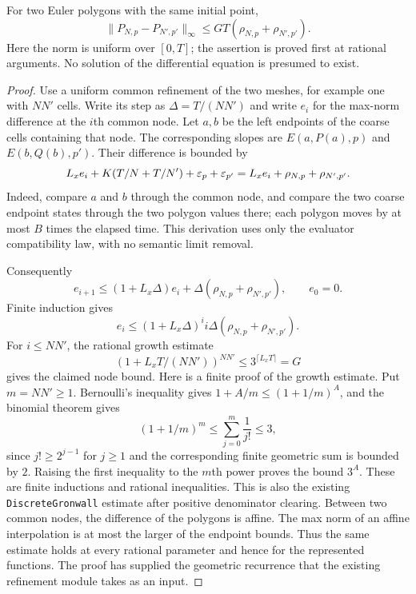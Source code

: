 \begin{lemma}
\label{lem:analytic-euler-comparison}
For two Euler polygons with the same initial point,
\begin{equation}
 \|P_{N,p}-P_{N',p'}\|_\infty
 \le GT(\rho_{N,p}+\rho_{N',p'}).\label{eq:analytic-euler-comparison}
\end{equation}
Here the norm is uniform over $[0,T]$; the assertion is proved first at rational arguments.  No solution of the differential equation is presumed to exist.
\end{lemma}

\begin{proof}
Use a uniform common refinement of the two meshes, for example one with $NN'$ cells.  Write its step as $\Delta=T/(NN')$ and write $e_i$ for the max-norm difference at the $i$th common node.  Let $a,b$ be the left endpoints of the coarse cells containing that node.  The corresponding slopes are $E(a,P(a),p)$ and $E(b,Q(b),p')$.  Their difference is bounded by
\[
 L_xe_i+K(T/N+T/N')+\varepsilon_p+\varepsilon_{p'}
 =L_xe_i+\rho_{N,p}+\rho_{N',p'}.
\]
Indeed, compare $a$ and $b$ through the common node, and compare the two coarse endpoint states through the two polygon values there; each polygon moves by at most $B$ times the elapsed time.  This derivation uses only the evaluator compatibility law, with no semantic limit removal.

Consequently
\[
 e_{i+1}\le(1+L_x\Delta)e_i+
 \Delta(\rho_{N,p}+\rho_{N',p'}),\qquad e_0=0.
\]
Finite induction gives
\[
 e_i\le(1+L_x\Delta)^i
 i\Delta(\rho_{N,p}+\rho_{N',p'}).
\]
For $i\le NN'$, the rational growth estimate
\[
 (1+L_xT/(NN'))^{NN'}\le3^{\lceil L_xT\rceil}=G
\]
gives the claimed node bound.  Here is a finite proof of the growth estimate.  Put $m=NN'\ge1$.  Bernoulli's inequality gives $1+A/m\le(1+1/m)^A$, and the binomial theorem gives\[
 (1+1/m)^m\le\sum_{j=0}^{m}\frac1{j!}\le3,
\]
since $j!\ge2^{j-1}$ for $j\ge1$ and the corresponding finite geometric sum is bounded by $2$.  Raising the first inequality to the $m$th power proves the bound $3^A$.  These are finite inductions and rational inequalities.  This is also the existing \texttt{DiscreteGronwall} estimate after positive denominator clearing.  Between two common nodes, the difference of the polygons is affine.  The max norm of an affine interpolation is at most the larger of the endpoint bounds.  Thus the same estimate holds at every rational parameter and hence for the represented functions.  The proof has supplied the geometric recurrence that the existing refinement module takes as an input.
\end{proof}

